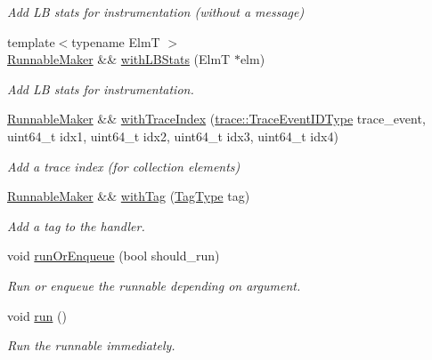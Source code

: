 \begin{DoxyCompactItemize}
\begin{DoxyCompactList}\small\item\em Add LB stats for instrumentation (without a message) \end{DoxyCompactList}\item 
{\footnotesize template$<$typename ElmT $>$ }\\\hyperlink{structvt_1_1runnable_1_1_runnable_maker}{Runnable\+Maker} \&\& \hyperlink{structvt_1_1runnable_1_1_runnable_maker_a2d59781f97ad319ceefcde673339364c}{with\+L\+B\+Stats} (ElmT $\ast$elm)
\begin{DoxyCompactList}\small\item\em Add LB stats for instrumentation. \end{DoxyCompactList}\item 
\hyperlink{structvt_1_1runnable_1_1_runnable_maker}{Runnable\+Maker} \&\& \hyperlink{structvt_1_1runnable_1_1_runnable_maker_a37eb87c4f7d045cfa5ff7e11d9082dd3}{with\+Trace\+Index} (\hyperlink{namespacevt_1_1trace_a64a7185f3e102df8d8258f263ccd1582}{trace\+::\+Trace\+Event\+I\+D\+Type} trace\+\_\+event, uint64\+\_\+t idx1, uint64\+\_\+t idx2, uint64\+\_\+t idx3, uint64\+\_\+t idx4)
\begin{DoxyCompactList}\small\item\em Add a trace index (for collection elements) \end{DoxyCompactList}\item 
\hyperlink{structvt_1_1runnable_1_1_runnable_maker}{Runnable\+Maker} \&\& \hyperlink{structvt_1_1runnable_1_1_runnable_maker_a3a22a3b3952eb54f07e610000f833d7e}{with\+Tag} (\hyperlink{namespacevt_a84ab281dae04a52a4b243d6bf62d0e52}{Tag\+Type} tag)
\begin{DoxyCompactList}\small\item\em Add a tag to the handler. \end{DoxyCompactList}\item 
void \hyperlink{structvt_1_1runnable_1_1_runnable_maker_aa0ae94d80e43385c18ee1e2afbce59a2}{run\+Or\+Enqueue} (bool should\+\_\+run)
\begin{DoxyCompactList}\small\item\em Run or enqueue the runnable depending on argument. \end{DoxyCompactList}\item 
void \hyperlink{structvt_1_1runnable_1_1_runnable_maker_a8fb3e1362dd6f746e991786654f5bd40}{run} ()
\begin{DoxyCompactList}\small\item\em Run the runnable immediately. \end{DoxyCompactList}\item 

\end{DoxyCompactItemize}

